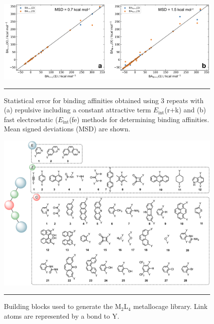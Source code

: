 \documentclass[../../main.tex]{subfiles}
\newcommand{\MLf}{M$_2$L$_4$ }
\begin{document}
\begin{figure}[h!]
	\vspace{0.4cm}
	\centering
	\includegraphics[width=\textwidth]{3/cgbind/figs/figS6}
	\vspace{0.2cm}
	\hrule
	\caption{Statistical error for binding affinities obtained using 3 repeats with (a) repulsive including a constant attractive term $E_\text{int}$(r+k) and (b) fast electrostatic ($E_\text{int}$(fe) methods for determining binding affinities. Mean signed deviations (MSD) are shown.}
	\label{fig::si_cg_6}
\end{figure}



\begin{figure}[h!]
	\vspace{0.4cm}
	\centering
	\includegraphics[width=\textwidth]{3/cgbind/figs/figS7}
	\vspace{0.2cm}
	\hrule
	\caption{Building blocks used to generate the \MLf metallocage library. Link atoms are represented by a bond to Y.}
	\label{fig::si_cg_7}
\end{figure}
\end{document}
